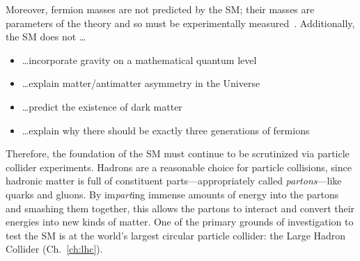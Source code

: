 Moreover, fermion masses are not predicted by the SM;
their masses are parameters of the theory and so must be experimentally measured~\cite{Halzen:1984mc}.
Additionally, the SM does not \ldots
\begin{itemize}
    \item \ldots incorporate gravity on a mathematical quantum level
    \item \ldots explain matter/antimatter asymmetry in the Universe
    \item \ldots predict the existence of dark matter~\cite{particle_data_group_review_2020}
    \item \ldots explain why there should be exactly three generations of fermions
\end{itemize}

Therefore, the foundation of the SM must continue to be scrutinized via particle collider experiments.
Hadrons are a reasonable choice for particle collisions, since hadronic matter is full of constituent parts---appropriately called \emph{partons}---like quarks and gluons.
By im\emph{part}ing immense amounts of energy into the partons and smashing them together, this allows the partons to interact and convert their energies into new kinds of matter.
One of the primary grounds of investigation to test the SM is at the world's largest circular particle collider: the Large Hadron Collider (Ch.~\ref{ch:lhc}).
